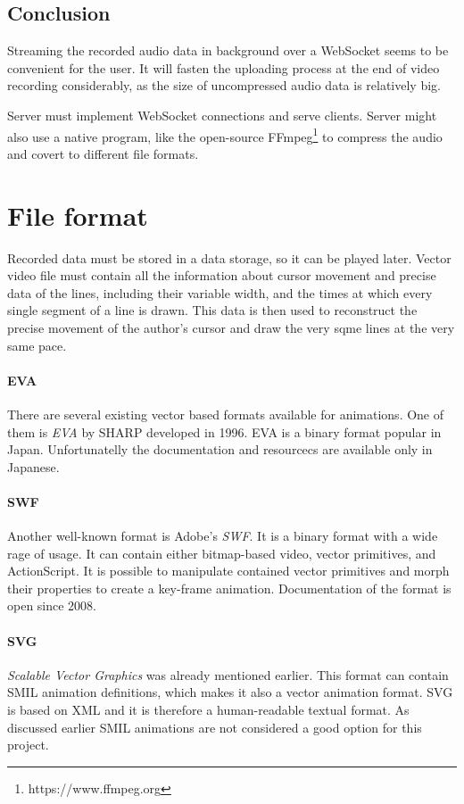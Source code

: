 \subsection{Conclusion}
Streaming the recorded audio data in background over a WebSocket seems to be convenient for the user. It will fasten the uploading process at the end of video recording considerably, as the size of uncompressed audio data is relatively big.

Server must implement WebSocket connections and serve clients. Server might also use a native program, like the open-source FFmpeg\footnote{https://www.ffmpeg.org} to compress the audio and covert to different file formats.

\section{File format}
Recorded data must be stored in a data storage, so it can be played later. Vector video file must contain all the information about cursor movement and precise data of the lines, including their variable width, and the times at which every single segment of a line is drawn. This data is then used to reconstruct the precise movement of the author's cursor and draw the very sqme lines at the very same pace.

\paragraph{EVA} There are several existing vector based formats available for animations. One of them is \textit{EVA} by SHARP\cite{eva_sharp} developed in 1996. EVA is a binary format popular in Japan. Unfortunatelly the documentation and resourcecs are available only in Japanese\cite{eva_wikipedia}.

\paragraph{SWF} Another well-known format is Adobe's \textit{SWF}. It is a binary format with a wide rage of usage. It can contain either bitmap-based video, vector primitives, and ActionScript\cite{swf_wiki}. It is possible to manipulate contained vector primitives and morph their properties to create a key-frame animation\cite{swf_doc}. Documentation of the format is open since 2008.

\paragraph{SVG} \textit{Scalable Vector Graphics} was already mentioned earlier. This format can contain SMIL animation definitions, which makes it also a vector animation format. SVG is based on XML and it is therefore a human-readable textual format. As discussed earlier SMIL animations are not considered a good option for this project.

